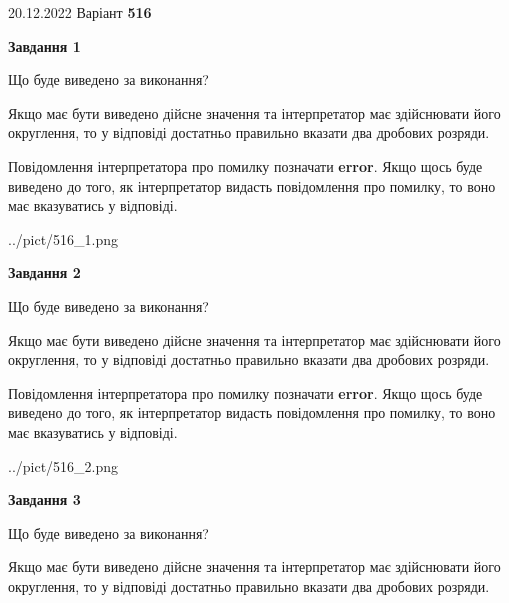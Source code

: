 \documentclass[12pt, ukrainian]{article}
\begin{document}
{20.12.2022 Варіант \No \textbf { 516 }\par}
{
\begin {Large}

{\begin {center}\textbf{Завдання 1}\end {center}}\par
Що буде виведено за виконання? \par

Якщо має бути виведено дійсне значення та інтерпретатор має здійснювати його округлення, 
то у відповіді достатньо правильно вказати два дробових розряди.

Повідомлення інтерпретатора про помилку позначати \textbf{error}.
Якщо щось буде виведено до того, як інтерпретатор видасть повідомлення про помилку, 
то воно має вказуватись у відповіді. \par

\begin{center}
	{../pict/516_1.png}
\end{center}
\newpage

{\begin {center}\textbf{Завдання 2}\end {center}}\par
Що буде виведено за виконання? \par

Якщо має бути виведено дійсне значення та інтерпретатор має здійснювати його округлення, 
то у відповіді достатньо правильно вказати два дробових розряди.

Повідомлення інтерпретатора про помилку позначати \textbf{error}.
Якщо щось буде виведено до того, як інтерпретатор видасть повідомлення про помилку, 
то воно має вказуватись у відповіді. \par

\begin{center}
	{../pict/516_2.png}
\end{center}
\newpage

{\begin {center}\textbf{Завдання 3}\end {center}}\par
Що буде виведено за виконання? \par

Якщо має бути виведено дійсне значення та інтерпретатор має здійснювати його округлення, 
то у відповіді достатньо правильно вказати два дробових розряди.


\end{Large}}
\end{document}
